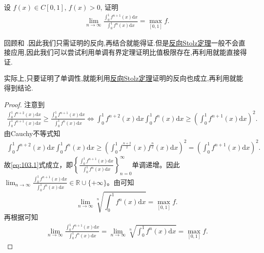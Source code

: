 \documentclass[../../main.tex]{subfiles}
\begin{document}
\begin{example}
设 $f(x) \in C[0,1]$, $f(x) > 0$, 证明
\begin{align*}
\lim_{n \to \infty} \frac{\int_0^1 f^{n+1}(x) \mathrm{d}x}{\int_0^1 f^n(x) \mathrm{d}x} = \max_{[0,1]} f.
\end{align*}
\end{example}
\begin{note}
回顾和
.因此我们只需证明的反向,再结合就能得证.但是\hyperref[theorem:反向Stolz定理]{反向Stolz定理}一般不会直接应用,因此我们可以尝试利用单调有界定理证明比值极限存在,再利用就能直接得证.

实际上,只要证明了单调性,就能利用\hyperref[theorem:反向Stolz定理]{反向Stolz定理}证明的反向也成立,再利用就能得到结论.
\end{note}
\begin{proof}
注意到
\begin{align}
\frac{\int_0^1 f^{n+2}(x) \mathrm{d}x}{\int_0^1 f^{n+1}(x) \mathrm{d}x} \geqslant \frac{\int_0^1 f^{n+1}(x) \mathrm{d}x}{\int_0^1 f^n(x) \mathrm{d}x} \Longleftrightarrow \int_0^1 f^{n+2}(x) \mathrm{d}x \int_0^1 f^n(x) \mathrm{d}x \geqslant \left( \int_0^1 f^{n+1}(x) \mathrm{d}x \right)^2.\label{eq:103.1}
\end{align}
由Cauchy不等式知
\begin{align*}
\int_0^1 f^{n+2}(x) \mathrm{d}x \int_0^1 f^n(x) \mathrm{d}x \geqslant \left( \int_0^1 f^{\frac{n+2}{2}}(x) f^{\frac{n}{2}}(x) \mathrm{d}x \right)^2 = \left( \int_0^1 f^{n+1}(x) \mathrm{d}x \right)^2.
\end{align*}
故\eqref{eq:103.1}式成立，即$\left\{ \frac{\int_0^1 f^{n+1}(x) \mathrm{d}x}{\int_0^1 f^n(x) \mathrm{d}x} \right\}_{n=0}^{\infty}$单调递增。因此$\lim_{n \to \infty} \frac{\int_0^1 f^{n+1}(x) \mathrm{d}x}{\int_0^1 f^n(x) \mathrm{d}x} \in \mathbb{R} \cup \{ +\infty \}$。由可知$$\lim_{n \to \infty} \sqrt[n]{\int_0^1 f^n(x) \mathrm{d}x} = \max_{[0,1]} f.$$再根据可知
\begin{align*}
\lim_{n \to \infty} \frac{\int_0^1 f^{n+1}(x) \mathrm{d}x}{\int_0^1 f^n(x) \mathrm{d}x} = \lim_{n \to \infty} \sqrt[n]{\int_0^1 f^n(x) \mathrm{d}x} = \max_{[0,1]} f.
\end{align*}

\end{proof}
\end{document}

